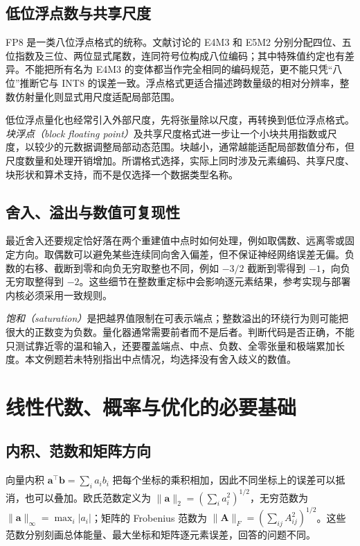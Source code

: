 \documentclass[UTF8,12pt,a4paper,fontset=fandol]{ctexart}
\begin{document}
\subsection{低位浮点数与共享尺度}
FP8 是一类八位浮点格式的统称。文献\cite{micikevicius2022}讨论的 E4M3 和 E5M2 分别分配四位、五位指数及三位、两位显式尾数，连同符号位构成八位编码；其中特殊值约定也有差异。不能把所有名为 E4M3 的变体都当作完全相同的编码规范，更不能只凭“八位”推断它与 INT8 的误差一致。浮点格式更适合描述跨数量级的相对分辨率，整数仿射量化则显式用尺度适配局部范围。

低位浮点量化也经常引入外部尺度，先将张量除以尺度，再转换到低位浮点格式。\emph{块浮点（block floating point）}及共享尺度格式进一步让一个小块共用指数或尺度，以较少的元数据调整局部动态范围。块越小，通常越能适配局部数值分布，但尺度数量和处理开销增加。所谓格式选择，实际上同时涉及元素编码、共享尺度、块形状和算术支持，而不是仅选择一个数据类型名称。

\subsection{舍入、溢出与数值可复现性}
最近舍入还要规定恰好落在两个重建值中点时如何处理，例如取偶数、远离零或固定方向。取偶数可以避免某些连续同向舍入偏差，但不保证神经网络误差无偏。负数的右移、截断到零和向负无穷取整也不同，例如 $-3/2$ 截断到零得到 $-1$，向负无穷取整得到 $-2$。这些细节在整数重定标中会影响逐元素结果，参考实现与部署内核必须采用一致规则。

\emph{饱和（saturation）}是把越界值限制在可表示端点；整数溢出的环绕行为则可能把很大的正数变为负数。量化器通常需要前者而不是后者。判断代码是否正确，不能只测试靠近零的温和输入，还要覆盖端点、中点、负数、全零张量和极端累加长度。本文例题若未特别指出中点情况，均选择没有舍入歧义的数值。

\section{线性代数、概率与优化的必要基础}
\label{sec:quant-math}

\subsection{内积、范数和矩阵方向}
向量内积 $\mathbf a^\top\mathbf b=\sum_i a_i b_i$ 把每个坐标的乘积相加，因此不同坐标上的误差可以抵消，也可以叠加。欧氏范数定义为 $\|\mathbf a\|_2=(\sum_i a_i^2)^{1/2}$，无穷范数为 $\|\mathbf a\|_\infty=\max_i|a_i|$；矩阵的 Frobenius 范数为 $\|\mathbf A\|_F=(\sum_{ij}A_{ij}^2)^{1/2}$。这些范数分别刻画总体能量、最大坐标和矩阵逐元素误差，回答的问题不同。
\end{document}
